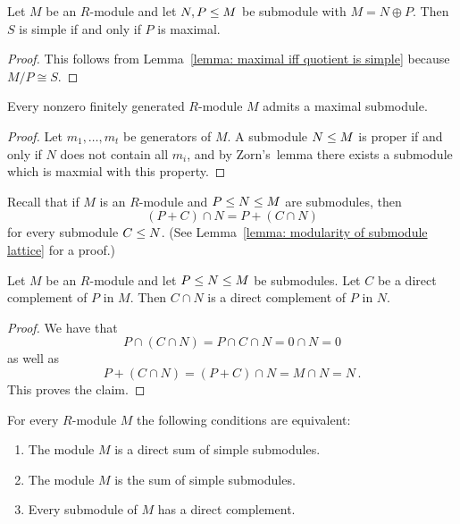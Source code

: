 \begin{corollary}
  Let $M$ be an $R$-module and let $N, P \leq M$ be submodule with $M = N \oplus P$.
  Then $S$ is simple if and only if $P$ is maximal.
\end{corollary}


\begin{proof}
  This follows from Lemma~\ref{lemma: maximal iff quotient is simple} because $M/P \cong S$.
\end{proof}


\begin{lemma}
  \label{lemma: fg modules contain max submodules}
  Every nonzero finitely generated $R$-module $M$ admits a maximal submodule.
\end{lemma}


\begin{proof}
  Let $m_1, \dotsc, m_t$ be generators of $M$.
  A submodule $N \leq M$ is proper if and only if $N$ does not contain all $m_i$, and by Zorn’s~lemma there exists a submodule which is maxmial with this property.
\end{proof}


\begin{fluff}
  Recall that if $M$ is an $R$-module and $P \leq N \leq M$ are submodules, then
  \[
      (P + C) \cap N
    = P + (C \cap N)
  \]
  for every submodule $C \leq N$.
  (See Lemma~\ref{lemma: modularity of submodule lattice} for a proof.)
\end{fluff}


\begin{corollary}
  \label{corollary: direct complements in submodules}
  Let $M$ be an $R$-module and let $P \leq N \leq M$ be submodules.
  Let $C$ be a direct complement of $P$ in $M$.
  Then $C \cap N$ is a direct complement of $P$ in $N$.
\end{corollary}


\begin{proof}
  We have that
  \[
      P \cap (C \cap N)
    = P \cap C \cap N
    = 0 \cap N
    = 0
  \]
  as well as
  \[
      P + (C \cap N)
    = (P + C) \cap N
    = M \cap N
    = N \,.
  \]
  This proves the claim.
\end{proof}




\begin{proposition}
  \label{proposition: characterisation semisimple modules}
  For every $R$-module $M$ the following conditions are equivalent:
  \begin{enumerate}
    \item
      \label{enumerate: direct sum of simple}
      The module $M$ is a direct sum of simple submodules. 
    \item
      \label{enumerate: sum of simple}
      The module $M$ is the sum of simple submodules.
    \item
      \label{enumerate: direct complements}
      Every submodule of $M$ has a direct complement.
  \end{enumerate}
\end{proposition}


